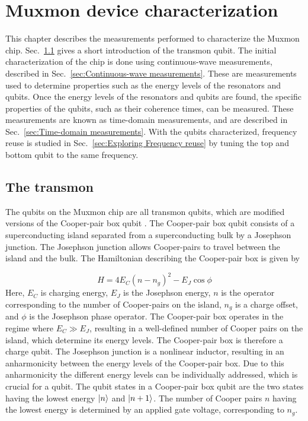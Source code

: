   \chapter{Muxmon device characterization}
    \label{ch:Muxmon device characterization}

    This chapter describes the measurements performed to characterize the Muxmon chip. Sec.~\ref{sec:The transmon} gives a short introduction of the transmon qubit. The initial characterization of the chip is done using continuous-wave measurements, described in Sec.~\ref{sec:Continuous-wave measurements}. These are measurements used to determine properties such as the energy levels of the resonators and qubits. Once the energy levels of the resonators and qubits are found, the specific properties of the qubits, such as their coherence times, can be measured. These measurements are known as time-domain measurements, and are described in Sec.~\ref{sec:Time-domain measurements}. With the qubits characterized, frequency reuse is studied in Sec.~\ref{sec:Exploring Frequency reuse} by tuning the top and bottom qubit to the same frequency.

    \section{The transmon}
      \label{sec:The transmon}
      The qubits on the Muxmon chip are all transmon qubits, which are modified versions of the Cooper-pair box qubit \cite{bouchiat1998CooperPairBox,nakamura1999coherent}. The Cooper-pair box qubit consists of a superconducting island separated from a superconducting bulk by a Josephson junction. The Josephson junction allows Cooper-pairs to travel between the island and the bulk. The Hamiltonian describing the Cooper-pair box is given by

      \begin{equation}
        H=4 E_C (n - n_g)^2-E_J \cos \phi
        \label{eq:Cooper-pair box Hamiltonian}
      \end{equation}
      Here, $E_C$ is charging energy, $E_J$ is the Josephson energy, $n$ is the operator corresponding to the number of Cooper-pairs on the island, $n_g$ is a charge offset, and $\phi$ is the Josephson phase operator. The Cooper-pair box operates in the regime where $E_C \gg E_J$, resulting in a well-defined number of Cooper pairs on the island, which determine its energy levels. The Cooper-pair box is therefore a charge qubit. The Josephson junction is a nonlinear inductor, resulting in an anharmonicity between the energy levels of the Cooper-pair box. Due to this anharmonicity the different energy levels can be individually addressed, which is crucial for a qubit. The qubit states in a Cooper-pair box qubit are the two states having the lowest energy $\ket{n}$ and $\ket{n+1}$. The number of Cooper pairs $n$ having the lowest energy is determined by an applied gate voltage, corresponding to $n_g$.

